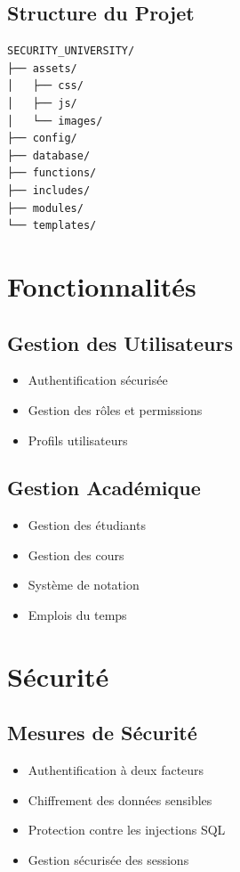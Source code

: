 \documentclass[12pt,a4paper]{report}
\begin{document}
\section{Structure du Projet}
\begin{lstlisting}[language=bash]
SECURITY_UNIVERSITY/
├── assets/
│   ├── css/
│   ├── js/
│   └── images/
├── config/
├── database/
├── functions/
├── includes/
├── modules/
└── templates/
\end{lstlisting}

\chapter{Fonctionnalités}
\section{Gestion des Utilisateurs}
\begin{itemize}
    \item Authentification sécurisée
    \item Gestion des rôles et permissions
    \item Profils utilisateurs
\end{itemize}

\section{Gestion Académique}
\begin{itemize}
    \item Gestion des étudiants
    \item Gestion des cours
    \item Système de notation
    \item Emplois du temps
\end{itemize}

\chapter{Sécurité}
\section{Mesures de Sécurité}
\begin{itemize}
    \item Authentification à deux facteurs
    \item Chiffrement des données sensibles
    \item Protection contre les injections SQL
    \item Gestion sécurisée des sessions
\end{itemize}
\end{document}
